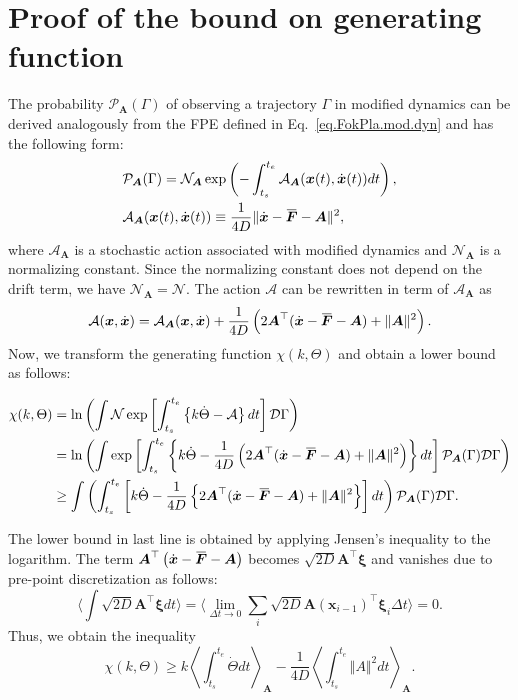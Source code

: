 \documentclass[pre,
twocolumn,
]{revtex4-1}
\newcommand{\overbar}[1]{\mkern 1.5mu\overline{\mkern-1.5mu#1\mkern-1.5mu}\mkern 1.5mu}
\theoremstyle{definition}
\theoremstyle{definition}
\newcommand{\bol}{\boldsymbol}
\newcommand{\mca}{\mathcal}
\newcommand{\eq}[1]{\begin{equation}#1\end{equation}}
\newcommand{\al}[1]{\begin{align}#1\end{align}}
\newcommand{\als}[1]{\begin{align*}#1\end{align*}}
\newcommand{\avgB}[1]{\Big\langle #1\Big\rangle}
\newcommand{\avgl}[1]{\left\langle #1\right\rangle}
\newcommand{\inl}[1]{$ #1 $}
\newcommand{\bra}[1]{\left( #1 \right)}
\newcommand{\bras}[1]{\left[ #1 \right]}
\newcommand{\brab}[1]{\left\{ #1 \right\}}
\newcommand{\norm}[1]{\Vert #1 \Vert}
\begin{document}
\section{Proof of the bound on generating function}\label{app.pro.bou.gen.fun}
The probability \inl{\mca{P}_{\bol{A}}(\Gamma)} of observing a trajectory \inl{\Gamma} in modified dynamics can be derived analogously from the FPE defined in Eq.~\eqref{eq.FokPla.mod.dyn} and has the following form:
\al{
&\mca{P}_{\bol{A}}(\Gamma)=\mca{N}_{\bol{A}}\exp\bra{-\int_{t_s}^{t_e}\mca{A}_{\bol{A}}(\bol{x}(t),\dot{\bol{x}}(t))dt},\\
&\mca{A}_{\bol{A}}(\bol{x}(t),\dot{\bol{x}}(t))\equiv\frac{1}{4D}\norm{\dot{\bol{x}}-\overbar{\bol{F}}-\bol{A}}^2,
}
where \inl{\mca{A}_{\bol{A}}} is a stochastic action associated with modified dynamics and \inl{\mca{N}_{\bol{A}}} is a normalizing constant.
Since the normalizing constant does not depend on the drift term, we have \inl{\mca{N}_{\bol{A}}=\mca{N}}.
The action \inl{\mca{A}} can be rewritten in term of \inl{\mca{A}_{\bol{A}}} as
\eq{
\mca{A}(\bol{x},\dot{\bol{x}})=\mca{A}_{\bol{A}}(\bol{x},\dot{\bol{x}})+\frac{1}{4D}\bra{2\bol{A}^\top(\dot{\bol{x}}-\overbar{\bol{F}}-\bol{A})+\norm{\bol{A}}^2}.
}
Now, we transform the generating function \inl{\chi(k,\Theta)} and obtain a lower bound as follows:
\begin{widetext}
\als{
\chi(k,\Theta)&=\ln\bra{\int\mca{N}\exp\bras{\int_{t_s}^{t_e}\brab{k\dot{\Theta}-\mca{A}}dt}\mca{D}\Gamma}\\
&=\ln\bra{\int\exp\bras{\int_{t_s}^{t_e}\brab{k\dot{\Theta}-\frac{1}{4D}\bra{2\bol{A}^\top(\dot{\bol{x}}-\overbar{\bol{F}}-\bol{A})+\norm{\bol{A}}^2}}dt}\mca{P}_{\bol{A}}(\Gamma)\mca{D}\Gamma}\\
&\ge\int\bra{\int_{t_s}^{t_e}\bras{k\dot{\Theta}-\frac{1}{4D}\brab{2\bol{A}^\top(\dot{\bol{x}}-\overbar{\bol{F}}-\bol{A})+\norm{\bol{A}}^2}}dt}\mca{P}_{\bol{A}}(\Gamma)\mca{D}\Gamma.
}
\end{widetext}
The lower bound in last line is obtained by applying Jensen's inequality to the logarithm.
The term \inl{\bol{A}^\top\bra{\dot{\bol{x}}-\overbar{\bol{F}}-\bol{A}}} becomes \inl{\sqrt{2D}\bol{A}^\top\bol{\xi}} and vanishes due to pre-point discretization as follows:
\eq{
\avgB{\int\sqrt{2D}\bol{A}^\top\bol{\xi}dt}=\avgB{\lim_{\Delta t\to 0}\sum_{i}\sqrt{2D}\bol{A}(\bol{x}_{i-1})^\top\bol{\xi}_{i}\Delta t}=0.
}
Thus, we obtain the inequality
\eq{
\chi(k,\Theta)\ge k\avgl{\int_{t_s}^{t_e}\dot{\Theta}dt}_{\bol{A}}-\frac{1}{4D}\avgl{\int_{t_s}^{t_e}\norm{A}^2dt}_{\bol{A}}.
}
\end{document}
